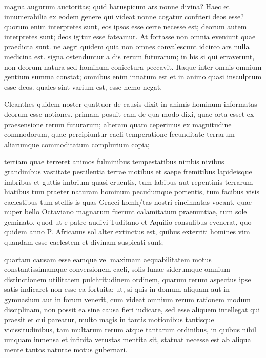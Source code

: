  magna augurum auctoritas; quid haruspicum ars nonne divina? Haec et innumerabilia ex eodem genere qui videat nonne cogatur confiteri deos esse? quorum enim interpretes sunt, eos ipsos esse certe necesse est; deorum autem interpretes sunt; deos igitur esse fateamur. At fortasse non omnia eveniunt quae praedicta sunt. ne aegri quidem quia non omnes convalescunt idcirco ars nulla medicina est. signa ostenduntur a dis rerum futurarum; in his si qui erraverunt, non deorum natura sed hominum coniectura peccavit. Itaque inter omnis omnium gentium summa constat; omnibus enim innatum est et in animo quasi insculptum esse deos. quales sint varium est, esse nemo negat.

 Cleanthes quidem noster quattuor de causis dixit in animis hominum informatas deorum esse notiones. primam posuit eam de qua modo dixi, quae orta esset ex praesensione rerum futurarum; alteram quam ceperimus ex magnitudine commodorum, quae percipiuntur caeli temperatione fecunditate terrarum aliarumque commoditatum complurium copia;

 tertiam quae terreret animos fulminibus tempestatibus nimbis nivibus grandinibus vastitate pestilentia terrae motibus et saepe fremitibus lapideisque imbribus et guttis imbrium quasi cruentis, tum labibus aut repentinis terrarum hiatibus tum praeter naturam hominum pecudumque portentis, tum facibus visis caelestibus tum stellis is quas Graeci komh/tas nostri cincinnatas vocant, quae nuper bello Octaviano magnarum fuerunt calamitatum praenuntiae, tum sole geminato, quod ut e patre audivi Tuditano et Aquilio consulibus evenerat, quo quidem anno P. Africanus sol alter extinctus est, quibus exterriti homines vim quandam esse caelestem et divinam suspicati sunt;

 quartam causam esse eamque vel maximam aequabilitatem motus constantissimamque conversionem caeli, solis lunae siderumque omnium distinctionem utilitatem pulchritudinem ordinem, quarum rerum aspectus ipse satis indicaret non esse ea fortuita: ut, si quis in domum aliquam aut in gymnasium aut in forum venerit, cum videat omnium rerum rationem modum disciplinam, non possit ea sine causa fieri iudicare, sed esse aliquem intellegat qui praesit et cui pareatur, multo magis in tantis motionibus tantisque vicissitudinibus, tam multarum rerum atque tantarum ordinibus, in quibus nihil umquam inmensa et infinita vetustas mentita sit, statuat necesse est ab aliqua mente tantos naturae motus gubernari.

